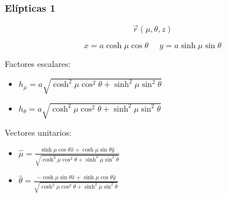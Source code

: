 \subsubsection{Elípticas 1}

\[\Vec{r}(\mu,\theta,z)\]

\begin{minipage}{0.55\textwidth}
\begin{equation}
    x = a\cosh{\mu}\cos{\theta}\,\,\,\,\,\,\,\,
    y = a\sinh{\mu}\sin{\theta}
\nonumber
\end{equation}
\end{minipage}

\bigbreak
Factores escalares:
\begin{itemize}
    \item $h_\mu = a\sqrt{\cosh^2{\mu}\cos^2{\theta}
    +\sinh^2{\mu}\sin^2{\theta}}$
    \item $h_\theta = a\sqrt{\cosh^2{\mu}\cos^2{\theta}
    +\sinh^2{\mu}\sin^2{\theta}}$
\end{itemize}
\bigbreak
Vectores unitarios:

\begin{itemize}
    \item $\hat{\mu}=\frac{\sinh{\mu}\cos{\theta}\hat{x}+\cosh{\mu}\sin{\theta}\hat{y}}{\sqrt{\cosh^2{\mu}\cos^2{\theta}
    +\sinh^2{\mu}\sin^2{\theta}}}$
    \item $\hat{\theta}=\frac{-\cosh{\mu}\sin{\theta}\hat{x}+\sinh{\mu}\cos{\theta}\hat{y}}{\sqrt{\cosh^2{\mu}\cos^2{\theta}+\sinh^2{\mu}\sin^2{\theta}}}$
\end{itemize}

\bigbreak











    
    
    

\newpage
